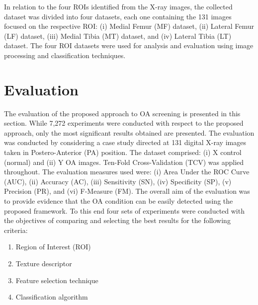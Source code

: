 \documentclass[review]{elsarticle}
\begin{document}
In relation to the four ROIs identified from the X-ray images, the collected dataset was divided into four datasets, each one containing the 131 images focused on the respective ROI: (i) Medial Femur (MF) dataset, (ii) Lateral Femur (LF) dataset, (iii) Medial Tibia (MT) dataset, and (iv) Lateral Tibia (LT) dataset. The four ROI datasets were used for analysis and evaluation using image processing and classification techniques.

\section{Evaluation}

The evaluation of the proposed approach to OA screening is presented in this section. While 7,272 experiments were conducted with respect to the proposed approach, only the most significant results obtained are presented. The evaluation was conducted by considering a case study directed at 131 digital X-ray images taken in Postero-Anterior (PA) position. The dataset comprised: (i) X control (normal) and (ii) Y OA images. Ten-Fold Cross-Validation (TCV) was applied throughout. The evaluation measures used were: (i) Area Under the ROC Curve (AUC), (ii) Accuracy (AC), (iii) Sensitivity (SN), (iv) Specificity (SP), (v) Precision (PR), and (vi) F-Measure (FM). The overall aim of the evaluation was to provide evidence that the OA condition can be easily detected using the proposed framework. To this end four sets of experiments were conducted with the objectives of comparing and selecting the best results for the following criteria:

\begin{enumerate}
\item Region of Interest (ROI)
\item Texture descriptor
\item Feature selection technique
\item Classification algorithm
\end{enumerate}


\end{document}
